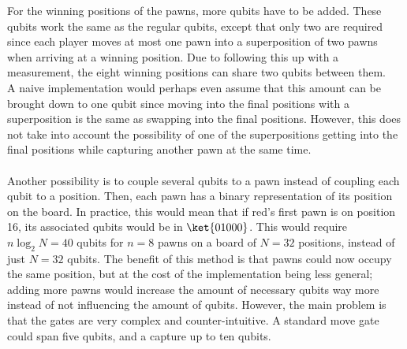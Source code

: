 \documentclass[final,5p,times,twocolumn,authoryear]{elsarticle}
\begin{document}
For the winning positions of the pawns, more qubits have to be added. These qubits work the same as the regular qubits, except that only two are required since each player moves at most one pawn into a superposition of two pawns when arriving at a winning position. Due to following this up with a measurement, the eight winning positions can share two qubits between them. 
\\
A naive implementation would perhaps even assume that this amount can be brought down to one qubit since moving into the final positions with a superposition is the same as swapping into the final positions. However, this does not take into account the possibility of one of the superpositions getting into the final positions while capturing another pawn at the same time. \\ \\
Another possibility is to couple several qubits to a pawn instead of coupling each qubit to a position. Then, each pawn has a binary representation of its position on the board. In practice, this would mean that if red's first pawn is on position 16, its associated qubits would be in $\ket{01000}$. This would require $n\log_2{N}=40$ qubits for $n=8$ pawns on a board of $N=32$ positions, instead of just $N=32$ qubits. The benefit of this method is that pawns could now occupy the same position, but at the cost of the implementation being less general; adding more pawns would increase the amount of necessary qubits way more instead of not influencing the amount of qubits. However, the main problem is that the gates are very complex and counter-intuitive. A standard move gate could span five qubits, and a capture up to ten qubits. 
\end{document}
